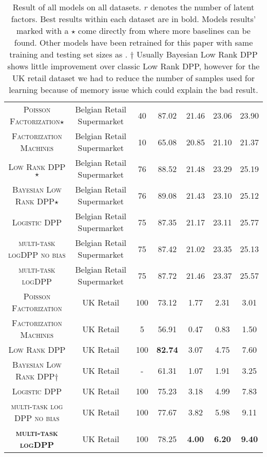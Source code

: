 \begin{table*}
\begin{center}
\begin{tabular}{ccccccc}
\textsc{Poisson Factorization}$\star$ & Belgian Retail Supermarket & 40 & 87.02 & 21.46 & 23.06 & 23.90 \\
\textsc{Factorization Machines} & Belgian Retail Supermarket & 10 & 65.08 & 20.85 & 21.10 & 21.37 \\
\textsc{Low Rank DPP}$\star$ & Belgian Retail Supermarket & 76 & 88.52 & 21.48 & 23.29 & 25.19 \\
\textsc{Bayesian Low Rank DPP}$\star$ & Belgian Retail Supermarket & 76 & 89.08 & 21.43 & 23.10 & 25.12 \\
\textsc{Logistic DPP} & Belgian Retail Supermarket & 75 & 87.35 & 21.17 & 23.11 & 25.77 \\ 
\textsc{multi-task logDPP no bias} & Belgian Retail Supermarket & 75 & 87.42 & 21.02 & 23.35 & 25.13 \\ 
\textsc{multi-task logDPP} & Belgian Retail Supermarket & 75 & 87.72 & 21.46 & 23.37 & 25.57 \\ \hline

\textsc{Poisson Factorization} & UK Retail & 100 & 73.12 & 1.77 & 2.31 & 3.01 \\
\textsc{Factorization Machines} & UK Retail & 5 & 56.91 & 0.47 & 0.83 & 1.50 \\
\textsc{Low Rank DPP} & UK Retail & 100 & \textbf{82.74} & 3.07 & 4.75 & 7.60 \\
\textsc{Bayesian Low Rank DPP}$\dagger$ & UK Retail & - & 61.31 & 1.07 & 1.91 & 3.25 \\
\textsc{Logistic DPP} & UK Retail & 100 & 75.23 & 3.18 & 4.99 & 7.83 \\ 
\textsc{multi-task log DPP no bias} & UK Retail & 100 & 77.67 & 3.82 & 5.98 & 9.11 \\ 
\textbf{\textsc{multi-task logDPP}} & UK Retail & 100 & 78.25 & \textbf{4.00} & \textbf{6.20} & \textbf{9.40} \\ 
\hline
\end{tabular}
\caption{Result of all models on all datasets. $r$ denotes the number of latent factors. Best results within each dataset are in bold. Models results' marked with a $\star$ come directly from \cite{DBLP:conf/aaai/GartrellPK17,DBLP:conf/recsys/GartrellPK16} where more baselines can be found. Other models have been retrained for this paper with same training and testing set sizes as \cite{DBLP:conf/aaai/GartrellPK17,DBLP:conf/recsys/GartrellPK16}. $\dagger$ Usually Bayesian Low Rank DPP shows little improvement over classic Low Rank DPP, however for the UK retail dataset we had to reduce the number of samples used for learning because of memory issue which could explain the bad result.}
\label{tab:results}
\end{center}
\end{table*}

